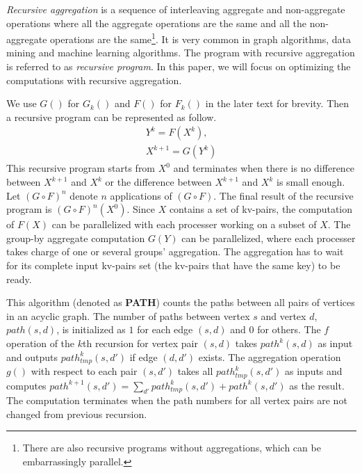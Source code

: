 \emph{Recursive aggregation} is a sequence of interleaving aggregate and non-aggregate operations where all the aggregate operations are the same and all the non-aggregate operations are the same\footnote{There are also recursive programs without aggregations, which can be embarrassingly parallel.}. It is very common in graph algorithms, data mining and machine learning algorithms. The program with recursive aggregation is referred to as \emph{recursive program}. In this paper, we will focus on optimizing the computations with recursive aggregation.

We use $G()$ for $G_k()$ and $F()$ for $F_k()$ in the later text for brevity. Then a recursive program can be represented as follow.
\begin{equation}
\label{eq:recursive2}
\begin{aligned}
Y^{k}=F(X^k),\\
X^{k+1}=G(Y^k)
\end{aligned}
\end{equation}
This recursive program starts from $X^0$ and terminates when there is no difference between $X^{k+1}$ and $X^k$ or the difference between $X^{k+1}$ and $X^k$ is small enough. Let $(G\circ F)^n$ denote $n$ applications of $(G\circ F)$. The final result of the recursive program is $(G\circ F)^n(X^0)$. Since $X$ contains a set of kv-pairs, the computation of $F(X)$ can be parallelized with each processer working on a subset of $X$. The group-by aggregate computation $G(Y)$ can be parallelized, where each processer takes charge of one or several groups' aggregation. The aggregation has to wait for its complete input kv-pairs set (the kv-pairs that have the same key) to be ready. 

 This algorithm (denoted as \textbf{PATH}) counts the paths between all pairs of vertices in an acyclic graph. The number of paths between vertex $s$ and vertex $d$, $path(s,d)$, is initialized as $1$ for each edge $(s,d)$ and $0$ for others. The $f$ operation of the $k$th recursion for vertex pair $(s,d)$ takes $path^k(s,d)$ as input and outputs $path_{tmp}^k(s,d')$ if edge $(d,d')$ exists. The aggregation operation $g()$ with respect to each pair $(s,d')$ takes all $path_{tmp}^k(s,d')$ as inputs and computes $path^{k+1}(s,d')=\sum_{d'} path_{tmp}^k(s,d')+path^k(s,d')$ as the result. The computation terminates when the path numbers for all vertex pairs are not changed from previous recursion.


